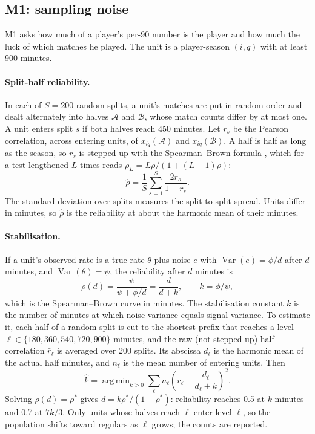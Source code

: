\documentclass[11pt,a4paper]{article}
\DeclareMathOperator{\Var}{Var}
\DeclareMathOperator*{\argmin}{arg\,min}
\begin{document}
\subsection{M1: sampling noise}
\label{sec:m1}

M1 asks how much of a player's per-90 number is the player and how much the
luck of which matches he played. The unit is a player-season $(i, q)$ with at
least 900 minutes.

\paragraph{Split-half reliability.}
In each of $S = 200$ random splits, a unit's matches are put in random order
and dealt alternately into halves $\mathcal A$ and $\mathcal B$, whose match
counts differ by at most one. A unit enters split $s$ if both halves reach 450
minutes. Let $r_s$ be the Pearson correlation, across entering units, of
$x_{iq}(\mathcal A)$ and $x_{iq}(\mathcal B)$. A half is half as long as the
season, so $r_s$ is stepped up with the Spearman--Brown formula
\citep{spearman1910faulty,brown1910experimental}, which for a test lengthened
$L$ times reads $\rho_L = L\rho / (1 + (L - 1)\rho)$:
\begin{equation}
  \hat\rho = \frac{1}{S}\sum_{s=1}^{S} \frac{2 r_s}{1 + r_s}.
  \label{eq:sb}
\end{equation}
The standard deviation over splits measures the split-to-split spread. Units
differ in minutes, so $\hat\rho$ is the reliability at about the harmonic mean
of their minutes.

\paragraph{Stabilisation.}
If a unit's observed rate is a true rate $\theta$ plus noise $e$ with
$\Var(e) = \phi / d$ after $d$ minutes, and $\Var(\theta) = \psi$, the
reliability after $d$ minutes is
\begin{equation}
  \rho(d) = \frac{\psi}{\psi + \phi/d} = \frac{d}{d + k}, \qquad k = \phi/\psi,
  \label{eq:stab}
\end{equation}
which is the Spearman--Brown curve in minutes. The stabilisation constant $k$
is the number of minutes at which noise variance equals signal variance. To
estimate it, each half of a random split is cut to the shortest prefix that
reaches a level $\ell \in \{180, 360, 540, 720, 900\}$ minutes, and the raw
(not stepped-up) half-correlation $\bar r_\ell$ is averaged over 200 splits.
Its abscissa $d_\ell$ is the harmonic mean of the actual half minutes, and
$n_\ell$ is the mean number of entering units. Then
\begin{equation}
  \hat k = \argmin_{k > 0} \sum_\ell n_\ell \left(\bar r_\ell - \frac{d_\ell}{d_\ell + k}\right)^2 .
  \label{eq:kfit}
\end{equation}
Solving $\rho(d) = \rho^\ast$ gives $d = k\rho^\ast/(1 - \rho^\ast)$: reliability
reaches 0.5 at $k$ minutes and 0.7 at $7k/3$. Only units whose halves reach
$\ell$ enter level $\ell$, so the population shifts toward regulars as $\ell$
grows; the counts are reported.
\end{document}
